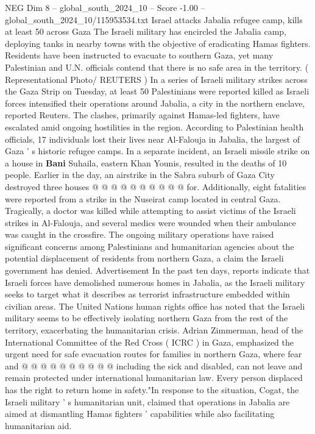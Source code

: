 \begin{textsample}{NEG Dim 8 – global\_south\_2024\_10 – Score -1.00 – global\_south\_2024\_10/115953534.txt}  \label{ex:f8_neg_198}
Israel attacks Jabalia refugee camp, kills at least 50 across Gaza The Israeli military has encircled the Jabalia camp, deploying tanks in nearby towns with the objective of eradicating Hamas fighters.
Residents have been instructed to evacuate to southern Gaza, yet many Palestinian and U.N. officials contend that there is no safe area in the territory. ( Representational Photo/ REUTERS ) In a series of Israeli military strikes across the Gaza Strip on Tuesday, at least 50 Palestinians were reported killed as Israeli forces intensified their operations around Jabalia, a city in the northern enclave, reported Reuters.
The clashes, primarily against Hamas-led fighters, have escalated amid ongoing hostilities in the region.
According to Palestinian health officials, 17 individuals lost their lives near Al-Falouja in Jabalia, the largest of Gaza ' s historic refugee camps.
In a separate incident, an Israeli missile strike on a house in \textbf{Bani} Suhaila, eastern Khan Younis, resulted in the deaths of 10 people.
Earlier in the day, an airstrike in the Sabra suburb of Gaza City destroyed three houses @ @ @ @ @ @ @ @ @ @ for.
Additionally, eight fatalities were reported from a strike in the Nuseirat camp located in central Gaza.
Tragically, a doctor was killed while attempting to assist victims of the Israeli strikes in Al-Falouja, and several medics were wounded when their ambulance was caught in the crossfire.
The ongoing military operations have raised significant concerns among Palestinians and humanitarian agencies about the potential displacement of residents from northern Gaza, a claim the Israeli government has denied.
Advertisement In the past ten days, reports indicate that Israeli forces have demolished numerous homes in Jabalia, as the Israeli military seeks to target what it describes as terrorist infrastructure embedded within civilian areas.
The United Nations human rights office has noted that the Israeli military seems to be effectively isolating northern Gaza from the rest of the territory, exacerbating the humanitarian crisis.
Adrian Zimmerman, head of the International Committee of the Red Cross ( ICRC ) in Gaza, emphasized the urgent need for safe evacuation routes for families in northern Gaza, where fear and @ @ @ @ @ @ @ @ @ @ including the sick and disabled, can not leave and remain protected under international humanitarian law.
Every person displaced has the right to return home in safety."In response to the situation, Cogat, the Israeli military ' s humanitarian unit, claimed that operations in Jabalia are aimed at dismantling Hamas fighters ' capabilities while also facilitating humanitarian aid.

\end{textsample}
